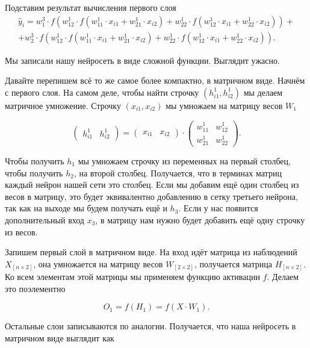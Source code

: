 \begin{sol}
Подставим результат вычисления первого слоя 
\begin{multline*}
\hat{y}_i = w_1^3 \cdot f( w^1_{12} \cdot f( w^1_{11} \cdot x_{i1} +  w^1_{21} \cdot x_{i2}) +  w^1_{22} \cdot f( w^1_{12} \cdot x_{i1} +  w^1_{22} \cdot x_{i2})) + \\ + w_2^3 \cdot f( w^1_{12} \cdot f( w^1_{11} \cdot x_{i1} +  w^1_{21} \cdot x_{i2}) +  w^1_{22} \cdot f( w^1_{12} \cdot x_{i1} +  w^1_{22} \cdot x_{i2})).
\end{multline*}

Мы записали нашу нейросеть в виде сложной функции. Выглядит ужасно. 

Давайте перепишем всё то же самое более компактно, в матричном виде. Начнём с первого слоя. На самом деле, чтобы найти строчку $(h^1_{i1}, h^1_{i2})$ мы делаем матричное умножение. Строчку $(x_{i1},  x_{i2})$ мы умножаем на матрицу весов $W_1$

\begin{equation*} 
    \begin{pmatrix} h^1_{i1} & h^1_{i2} \end{pmatrix} =  \begin{pmatrix} x_{i1} &  x_{i2}\end{pmatrix} \cdot \begin{pmatrix} w^1_{11} &  w^1_{12} \\ w^1_{21} & w^1_{22}\end{pmatrix}.
\end{equation*} 

Чтобы получить $h_1$ мы умножаем строчку из переменных на первый столбец, чтобы получить $h_2$, на второй столбец. Получается, что в терминах матриц каждый нейрон нашей сети это столбец. Если мы добавим ещё один столбец из весов в матрицу, это будет эквивалентно добавлению в сетку третьего нейрона, так как на выходе мы будем получать ещё и $h_3$. Если у нас появится дополнительный вход $x_3$, в матрицу нам нужно будет добавить ещё одну строчку из весов. 

Запишем первый слой в матричном виде. На вход идёт матрица из наблюдений $X_{[n \times 2]}$, она умножается на матрицу весов $W_{[2 \times 2]}$, получается матрица $H_{[n \times 2]}$. Ко всем элементам этой матрицы мы применяем функцию активации $f$. Делаем это поэлементно

\[
O_1 = f(H_1) = f(X\cdot W_1).
\]

Остальные слои записываются по аналогии. Получается, что наша нейросеть в матричном виде выглядит как 


\end{sol}
